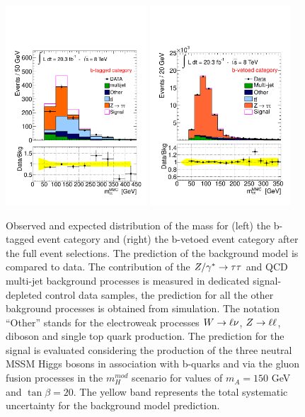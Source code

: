 \begin{figure}[tp]
     \begin{center}
            \includegraphics[width=0.47\textwidth]{figure/final_plots/Full_tag_qcd_reg.pdf}
            \includegraphics[width=0.47\textwidth]{figure/final_plots/Full_veto_qcd_reg.pdf}

    \end{center}
    \caption{ Observed and expected distribution of the \mmc mass for (left) the b-tagged event category and (right) the b-vetoed event category after
        the full event selections. The prediction of the  background model is compared to  data.
	The contribution of the $Z/\gamma^*\rightarrow \tau\tau$ and QCD multi-jet background processes is measured in  dedicated  signal-depleted control data samples,
	the prediction for all the other bakground processes is obtained from simulation. 
 	 The notation ``Other'' stands 	for the electroweak processes $W\rightarrow \ell \nu$, $Z\rightarrow \ell \ell$, diboson and single top quark production.
	The prediction for the signal is evaluated considering the production of the three neutral MSSM Higgs bosons in association with b-quarks
	and via the gluon fusion processes in the  $m_{H}^{mod}$ scenario for values of $m_A=150$ GeV and $\tan \beta =20$. 
	The yellow band represents the total systematic uncertainty for the background model prediction.
	}
   \label{fig:mmc_categories}
\end{figure}


